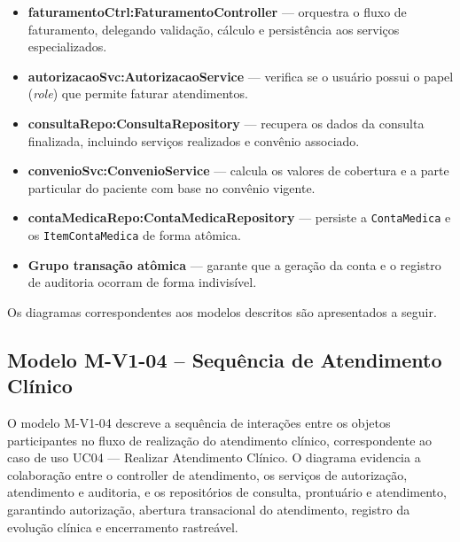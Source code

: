 \begin{itemize}
    \item \textbf{faturamentoCtrl:FaturamentoController} --- orquestra o fluxo de faturamento, delegando validação, cálculo e persistência aos serviços especializados.
    \item \textbf{autorizacaoSvc:AutorizacaoService} --- verifica se o usuário possui o papel (\textit{role}) que permite faturar atendimentos.
    \item \textbf{consultaRepo:ConsultaRepository} --- recupera os dados da consulta finalizada, incluindo serviços realizados e convênio associado.
    \item \textbf{convenioSvc:ConvenioService} --- calcula os valores de cobertura e a parte particular do paciente com base no convênio vigente.
    \item \textbf{contaMedicaRepo:ContaMedicaRepository} --- persiste a \texttt{ContaMedica} e os \texttt{ItemContaMedica} de forma atômica.
    \item \textbf{Grupo transação atômica} --- garante que a geração da conta e o registro de auditoria ocorram de forma indivisível.
\end{itemize}

Os diagramas correspondentes aos modelos descritos são apresentados a seguir.

\subsection{Modelo M-V1-04 -- Sequência de Atendimento Clínico}

O modelo M-V1-04 descreve a sequência de interações entre os objetos participantes no fluxo de realização do atendimento clínico, correspondente ao caso de uso UC04 --- Realizar Atendimento Clínico. O diagrama evidencia a colaboração entre o controller de atendimento, os serviços de autorização, atendimento e auditoria, e os repositórios de consulta, prontuário e atendimento, garantindo autorização, abertura transacional do atendimento, registro da evolução clínica e encerramento rastreável.

